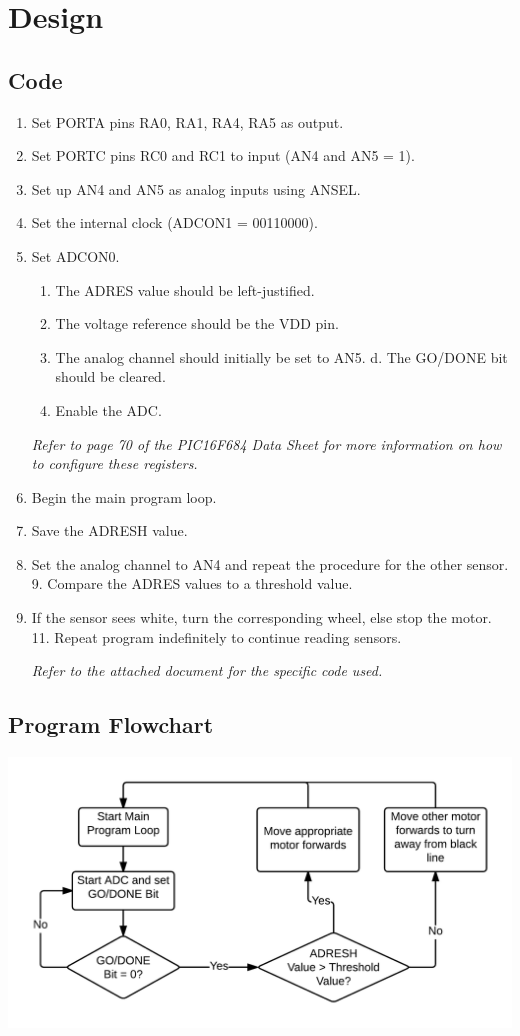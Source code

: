 \documentclass[12pt]{article}
\begin{document}
\section{Design}
\subsection{Code}
\begin{enumerate}
	\item Set PORTA pins RA0, RA1, RA4, RA5 as output.
	\item Set PORTC pins RC0 and RC1 to input (AN4 and AN5 = 1). \item Set up AN4 and AN5 as analog inputs using ANSEL.
	\item Set the internal clock (ADCON1 = 00110000).
	\item Set ADCON0.
	\begin{enumerate}
		\item The ADRES value should be left-justified.
		\item The voltage reference should be the VDD pin.
		\item The analog channel should initially be set to AN5. d. The GO/DONE bit should be cleared.
		\item Enable the ADC.
	\end{enumerate}
\textit{Refer to page 70 of the PIC16F684 Data Sheet for more information on how to configure these registers.}

	\item Begin the main program loop.
	\item Save the ADRESH value.
	\item Set the analog channel to AN4 and repeat the procedure for the other sensor. 9. Compare the ADRES values to a threshold value.
	\item If the sensor sees white, turn the corresponding wheel, else stop the motor. 11. Repeat program indefinitely to continue reading sensors.
	
\textit{Refer to the attached document for the specific code used.}
\end{enumerate}

\subsection{Program Flowchart}
\includegraphics{ProgramFlowchart}
\end{document}
